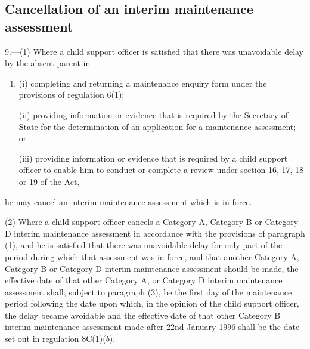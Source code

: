 \documentclass[a4paper]{article}
\newcommand\amendment[1]{\subsubsection*{Notes}{\itshape\frenchspacing\footnotesize #1 \par}}
\begin{document}
%
%
%
%

\subsection[9. Cancellation of an interim maintenance assessment]{Cancellation of an interim maintenance assessment}

9.—(1) Where a child support officer is satisfied that there was unavoidable delay by the absent parent in—
\begin{enumerate}\item[]
(i) completing and returning a maintenance enquiry form under the provisions of regulation 6(1);

(ii) providing information or evidence that is required by the Secretary of State for the determination of an application for a maintenance assessment; or

(iii) providing information or evidence that is required by a child support officer to enable him to conduct or complete a review under section 16, 17, 18 or 19 of the Act,
\end{enumerate}
he may cancel an interim maintenance assessment which is in force.

(2) Where a child support officer cancels a Category A, Category B or Category D interim maintenance assessment in accordance with the provisions of paragraph (1), and he is satisfied that there was unavoidable delay for only part of the period during which that assessment was in force, and that another Category A, Category B or Category D interim maintenance assessment should be made, the effective date of that other Category A, or Category D interim maintenance assessment shall, subject to paragraph (3), be the first day of the maintenance period following the date upon which, in the opinion of the child support officer, the delay became avoidable and the effective date of that other Category B interim maintenance assessment made after 22nd January 1996 shall be the date set out in regulation 8C(1)($b$).
\end{document}
